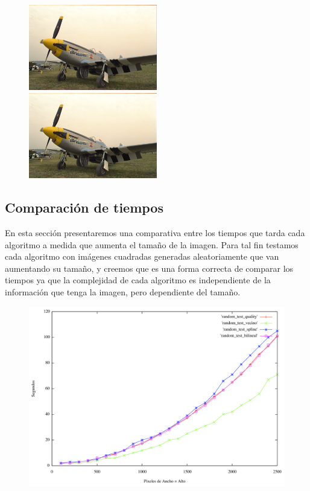 {\begin{figure}
       \includegraphics[width=0.5\textwidth]{imagenes/img9_demosicing_spline.png}
           \hfill
        \includegraphics[width=0.5\textwidth]{imagenes/img9_demosicing_quality.png}
\end{figure}

\newpage

\subsection{Comparación de tiempos}

En esta sección presentaremos una comparativa entre los tiempos que tarda cada algoritmo a medida que aumenta el tamaño de la imagen. Para tal fin testamos cada algoritmo con imágenes cuadradas generadas aleatoriamente que van aumentando su tamaño, y creemos que es una forma correcta de comparar los tiempos ya que la complejidad de cada algoritmo es independiente de la información que tenga la imagen, pero dependiente del tamaño.

\begin{figure}[h]
       \includegraphics[width=1\textwidth]{imagenes/tiempo_algoritmos_random.png}
\end{figure}

}
